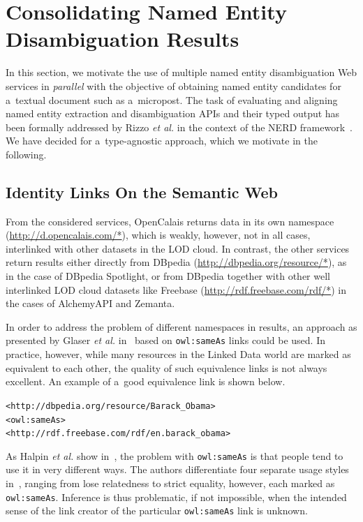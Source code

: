 \section{Consolidating Named Entity Disambiguation Results} 
\label{sec:consolidate}

In this section, we motivate the use of multiple
named entity disambiguation Web services in \emph{parallel}
with the objective of obtaining named entity candidates
for a~textual document such as a~micropost.
The task of evaluating and aligning named entity extraction and
disambiguation APIs and their typed output
has been formally addressed by Rizzo \emph{et al.}
in the context of the NERD
framework~\cite{rizzo2011nerd,rizzo2012nerd}.
We have decided for a~type-agnostic approach,
which we motivate in the following.

\subsection{Identity Links On the Semantic Web}
\label{sec:sameasorg}

From the considered services, OpenCalais returns data in its
own namespace (\url{http://d.opencalais.com/*}), which is
weakly, however, not in all cases,
interlinked with other datasets in the LOD cloud.
In contrast, the other services return results either directly
from DBpedia (\url{http://dbpedia.org/resource/*}),
as in the case of DBpedia Spotlight,
or from DBpedia together with other
well interlinked LOD cloud datasets like Freebase
(\url{http://rdf.freebase.com/rdf/*}) in the cases of
AlchemyAPI and Zemanta.

In order to address the problem of different namespaces in results,
an approach as presented by Glaser \emph{et al.} 
in~\cite{glaser2009sameas} based on \texttt{owl:sameAs} links
could be used.
In practice, however, while many resources in the Linked Data
world are marked as equivalent to each other,
the quality of such equivalence links is not always excellent.
An example of a~good equivalence link is shown below.

\texttt{<http://dbpedia.org/resource/Barack\_Obama>}\\
\indent \texttt{<owl:sameAs>}\\
\indent \texttt{<http://rdf.freebase.com/rdf/en.barack\_obama>}

\noindent As Halpin \emph{et al.} show
in~\cite{halpin2010owlsameas}, the problem
with \texttt{owl:sameAs} is that people tend to use it
in very different ways.
The authors differentiate four separate usage styles
in~\cite{halpin2010owlsameas}, ranging from lose relatedness
to strict equality, however, each marked as \texttt{owl:sameAs}.
Inference is thus problematic, if not impossible,
when the intended sense of the link creator of the particular
\texttt{owl:sameAs} link is unknown.

